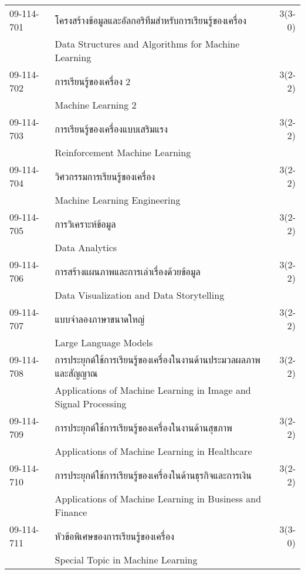 \begin{longtable}{p{}p{}r{}}
09-114-701 & โครงสร้างข้อมูลและอัลกอริทึมสำหรับการเรียนรู้ของเครื่อง & 3(3-0)\\
& Data Structures and Algorithms for Machine Learning & \\[3mm]
09-114-702 & การเรียนรู้ของเครื่อง 2 & 3(2-2)\\
& Machine Learning 2 & \\[3mm]
09-114-703 & การเรียนรู้ของเครื่องแบบเสริมแรง & 3(2-2)\\
& Reinforcement Machine Learning & \\[3mm]
09-114-704 & วิศวกรรมการเรียนรู้ของเครื่อง & 3(2-2)\\
& Machine Learning Engineering & \\[3mm]
09-114-705 & การวิเคราะห์ข้อมูล & 3(2-2)\\
& Data Analytics & \\[3mm]
09-114-706 & การสร้างแผนภาพและการเล่าเรื่องด้วยข้อมูล & 3(2-2)\\
& Data Visualization and Data Storytelling & \\[3mm]
09-114-707 & แบบจำลองภาษาขนาดใหญ่ & 3(2-2)\\
& Large Language Models & \\[3mm]
09-114-708 & การประยุกต์ใช้การเรียนรู้ของเครื่องในงานด้านประมวลผลภาพและสัญญาณ & 3(2-2)\\
& Applications of Machine Learning in Image and Signal Processing & \\[3mm]
09-114-709 & การประยุกต์ใช้การเรียนรู้ของเครื่องในงานด้านสุขภาพ  & 3(2-2)\\
& Applications of Machine Learning in Healthcare & \\[3mm]
09-114-710 & การประยุกต์ใช้การเรียนรู้ของเครื่องในด้านธุรกิจและการเงิน & 3(2-2)\\
& Applications of Machine Learning in Business and Finance & \\[3mm]
09-114-711 & หัวข้อพิเศษของการเรียนรู้ของเครื่อง  & 3(3-0)\\
& Special Topic in Machine Learning & \\[3mm]
\end{longtable}
